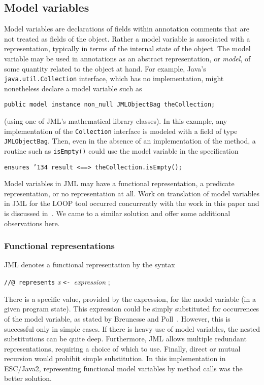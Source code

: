 \documentclass{sig-alternate2}
\begin{document}
\subsection{Model variables}

Model variables are declarations of fields within annotation comments that are not treated
as fields of the object.  Rather a model variable is associated with a representation, typically in 
terms of the internal state of the object.  The model variable may be used in annotations
as an abstract representation, or {\em model}, of some quantity related to the object at hand.
For example, Java's \texttt{java.util.Collection} interface, which has no implementation, might 
nonetheless declare a model variable such as
\begin{center} \texttt{public model instance non\_null JMLObjectBag theCollection;} \end{center}
(using one of JML's mathematical library classes).  
In this example, any implementation of the \texttt{Collection} interface is modeled with a field
of type \texttt{JMLObjectBag}.  
Then, even in the absence of an implementation of the method, a routine such as 
\texttt{isEmpty()} could use the model variable in the specification
\begin{center} \texttt{ensures \char'134 result <==> theCollection.isEmpty();} \end{center}

Model variables in JML may have a functional representation, a
predicate representation, or no representation at all.  Work on
translation of model variables in JML for the LOOP tool occurred
concurrently with the work in this paper and is discussed
in~\cite{BreunessePoll03}.  We came to a similar solution and offer
some additional observations here.

\subsubsection {Functional representations}

JML denotes a functional representation by the syntax
\begin{center} \texttt{//@ represents} {\em x} \texttt{<- }{\em  expression  } ; \end{center}
There is a specific value, provided by the expression, for the model variable (in a given program 
state).   This expression could be simply substituted for occurrences of the model variable, as
stated by Breunesse and Poll~\cite{BreunessePoll03}.  However, this is successful only in simple cases.  If there
is heavy use of model variables, the nested substitutions can be quite deep.  Furthermore,
JML allows multiple redundant representations, requiring a choice of which to use.  Finally,
direct or mutual recursion would prohibit simple substitution.  In this implementation in
ESC/Java2, representing functional model variables by method
calls was the better
solution.
\end{document}
